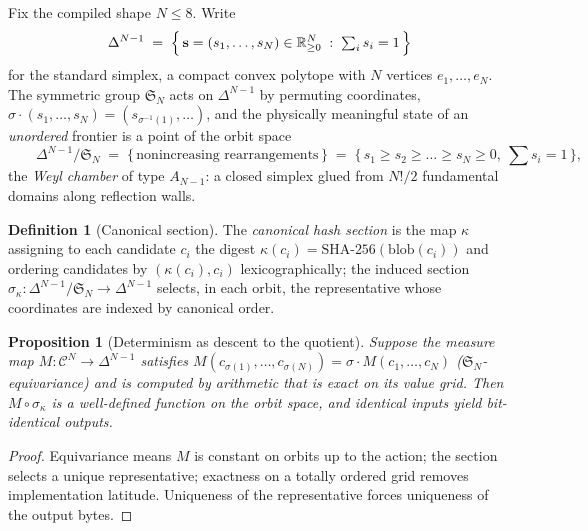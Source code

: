 \documentclass[12pt,oneside]{report}
\theoremstyle{plain}
\newtheorem{proposition}[theorem]{Proposition}
\theoremstyle{definition}
\newtheorem{definitionx}[theorem]{Definition}
\theoremstyle{remark}
\newcommand{\R}{\mathbb{R}}
\newcommand{\simplex}{\Delta}
\newcommand{\sym}{\mathfrak{S}}
\newcommand{\shares}{\mathbf{s}}
\begin{document}
Fix the compiled shape $N \le 8$. Write
\begin{equation}
\simplex^{N-1} \;=\; \Bigl\{\, \shares=(s_1,\dots,s_N)\in\R_{\ge 0}^N
\;:\; \textstyle\sum_i s_i = 1 \,\Bigr\}
\end{equation}
for the standard simplex, a compact convex polytope with $N$ vertices
$e_1,\dots,e_N$. The symmetric group $\sym_N$ acts on
$\simplex^{N-1}$ by permuting coordinates,
$\sigma\cdot(s_1,\dots,s_N) = (s_{\sigma^{-1}(1)},\dots)$, and the
physically meaningful state of an \emph{unordered} frontier is a point
of the orbit space
\begin{equation}
\qquad \simplex^{N-1}/\sym_N \;=\; \bigl\{\, \text{nonincreasing
rearrangements} \,\bigr\} \;=\; \bigl\{\, s_1\ge s_2 \ge \dots \ge
s_N\ge 0,\ \sum s_i = 1 \,\bigr\},
\end{equation}
the \emph{Weyl chamber} of type $A_{N-1}$: a closed simplex glued from
$N!/2$ fundamental domains along reflection walls.

\begin{definitionx}[Canonical section]
\label{def:canonical-section}
The \emph{canonical hash section} is the map $\kappa$ assigning to each
candidate $c_i$ the digest $\kappa(c_i) =
\mathrm{SHA\text{-}256}(\mathrm{blob}(c_i))$ and ordering candidates by
$(\kappa(c_i), c_i)$ lexicographically; the induced section
$\sigma_\kappa : \simplex^{N-1}/\sym_N \to \simplex^{N-1}$ selects, in
each orbit, the representative whose coordinates are indexed by
canonical order.
\end{definitionx}

\begin{proposition}[Determinism as descent to the quotient]
\label{prop:descent}
Suppose the measure map $M: \mathcal{C}^N \to \simplex^{N-1}$ satisfies
$M(c_{\sigma(1)},\dots,c_{\sigma(N)}) = \sigma\cdot
M(c_1,\dots,c_N)$ ($\sym_N$-equivariance) and is computed by
arithmetic that is exact on its value grid. Then
$M \circ \sigma_\kappa$ is a well-defined function on the orbit space,
and identical inputs yield bit-identical outputs.
\end{proposition}

\begin{proof}
Equivariance means $M$ is constant on orbits up to the action; the
section selects a unique representative; exactness on a totally ordered
grid removes implementation latitude. Uniqueness of the representative
forces uniqueness of the output bytes.
\end{proof}
\end{document}
